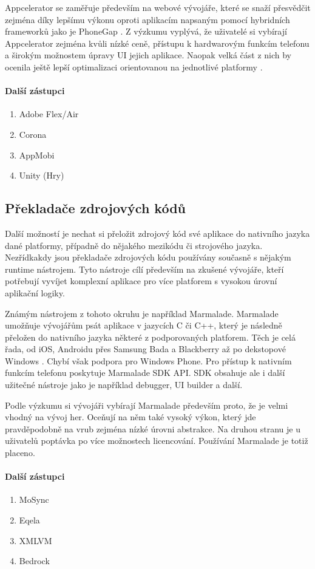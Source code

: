 Appcelerator se zaměřuje především na webové vývojáře, které se snaží přesvědčit zejména díky lepšímu výkonu oproti aplikacím napsaným pomocí hybridních frameworků jako je PhoneGap \cite{appcelerator_vs_phonegap}. Z výzkumu vyplývá, že uživatelé si vybírají Appcelerator zejména kvůli nízké ceně, přístupu k hardwarovým funkcím telefonu a širokým možnostem úpravy UI jejich aplikace. Naopak velká část z nich by ocenila ještě lepší optimalizaci orientovanou na jednotlivé platformy \cite{visionmobile_survey}.

\paragraph{Další zástupci}
\begin{enumerate}
	\item Adobe Flex/Air
	\item Corona
	\item AppMobi
	\item Unity (Hry)
\end{enumerate}

\subsection{Překladače zdrojových kódů}
Další možností je nechat si přeložit zdrojový kód své aplikace do nativního jazyka dané platformy, případně do nějakého mezikódu či strojového jazyka. Nezřídkakdy jsou překladače zdrojových kódu používány současně s nějakým runtime nástrojem. Tyto nástroje cílí především na zkušené vývojáře, kteří potřebují vyvíjet komplexní aplikace pro více platforem s vysokou úrovní aplikační logiky.

Známým nástrojem z tohoto okruhu je například Marmalade. Marmalade umožňuje vývojářům psát aplikace v jazycích C či C++, který je následně přeložen do nativního jazyka některé z podporovaných platforem. Těch je celá řada, od iOS, Androidu přes Samsung Bada a Blackberry až po dekstopové Windows \cite{marmalade}. Chybí však podpora pro Windows Phone. Pro přístup k nativním funkcím telefonu poskytuje Marmalade SDK API. SDK obsahuje ale i další užitečné nástroje jako je například debugger, UI builder a další.

Podle výzkumu si vývojáři vybírají Marmalade především proto, že je velmi vhodný na vývoj her. Oceňují na něm také vysoký výkon, který jde pravděpodobně na vrub zejména nízké úrovni abstrakce. Na druhou stranu je u uživatelů poptávka po více možnostech licencování. Používání Marmalade je totiž placeno. \cite{visionmobile_survey}

\paragraph{Další zástupci}
\begin{enumerate}
	\item MoSync
	\item Eqela
	\item XMLVM
	\item Bedrock
\end{enumerate}